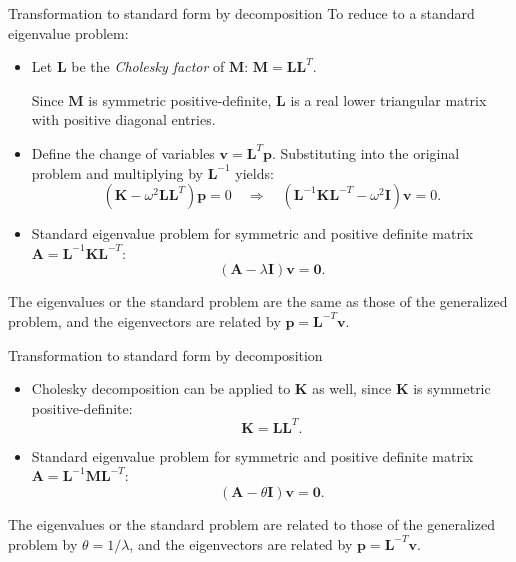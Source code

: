 \documentclass[aspectratio=169]{beamer}
\begin{document}
\begin{frame}{Transformation to standard form by decomposition}
  To reduce to a standard eigenvalue problem:
  \vspace{0.2cm}
  \begin{itemize}
    \item Let \( \mathbf{L} \) be the \emph{Cholesky factor} of \( \mathbf{M} \): \( \mathbf{M} = \mathbf{L} \mathbf{L}^T\).
          \begin{block}{}
            Since $\mathbf M$ is symmetric positive-definite, $\mathbf L$ is a real lower triangular matrix with positive diagonal entries.
          \end{block}
    \item Define the change of variables \( \mathbf{v} = \mathbf{L}^T \mathbf{p} \). Substituting into the original problem and multiplying by \( \mathbf{L}^{-1} \) yields:
          \[
            (\mathbf{K} - \omega^2 \mathbf{L} \mathbf{L}^T) \mathbf{p} =0
            \quad \Rightarrow \quad
            (\mathbf L^{-1}\mathbf{K}\mathbf L^{-T} - \omega^2 \mathbf{I}) \mathbf{v}=0.
          \]
    \item  Standard eigenvalue problem for symmetric and positive definite matrix \( \mathbf A=\mathbf L^{-1}\mathbf{K}\mathbf L^{-T}\):
          \[
            (\mathbf A - \lambda \mathbf{I})\mathbf v=\mathbf 0.
          \]

  \end{itemize}
  \begin{block}{}
    The eigenvalues or the standard problem are the same as those of the generalized problem, and the eigenvectors are related by \( \mathbf{p} = \mathbf{L}^{-T} \mathbf{v} \).
  \end{block}
\end{frame}

\begin{frame}{Transformation to standard form by decomposition}


  \begin{itemize}
    \item   Cholesky decomposition can be applied to $\mathbf K$ as well, since $\mathbf K$ is symmetric positive-definite:
          \[
            \mathbf{K} = \mathbf{L} \mathbf{L}^T.
          \]
    \item  Standard eigenvalue problem for symmetric and positive definite matrix \( \mathbf A=\mathbf L^{-1}\mathbf{M}\mathbf L^{-T}\):
          \[
            (\mathbf A - \theta \mathbf{I})\mathbf v=\mathbf 0.
          \]
  \end{itemize}
  \begin{block}{}
    The eigenvalues or the standard problem are related to those of the generalized problem by \( \theta = 1/\lambda \), and the eigenvectors are related by \( \mathbf{p} = \mathbf{L}^{-T} \mathbf{v} \).
  \end{block}
\end{frame}
\end{document}
